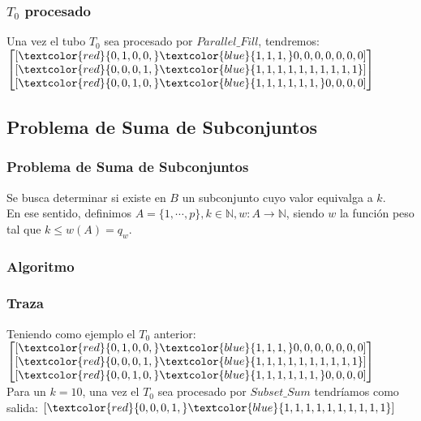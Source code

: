 \documentclass[12pt]{beamer}
\begin{document}
 \begin{frame}
     \frametitle{$T_0$ procesado}
     Una vez el tubo $T_0$ sea procesado por $Parallel\_Fill$, tendremos: \\
    $
        \begin{bmatrix}
            [\textcolor{red}{0, 1, 0, 0,} \textcolor{blue}{1, 1, 1,} 0, 0, 0, 0, 0, 0, 0] \\
            [\textcolor{red}{0, 0, 0, 1,} \textcolor{blue}{1, 1, 1, 1, 1, 1, 1, 1, 1, 1}] \\
            [\textcolor{red}{0, 0, 1, 0,} \textcolor{blue}{1, 1, 1, 1, 1, 1,} 0, 0, 0, 0]
        \end{bmatrix}
    $
 \end{frame}
 \begin{frame}
     \section{Problema de Suma de Subconjuntos}
     \frametitle{Problema de Suma de Subconjuntos}
     Se busca determinar si existe en $B$ un subconjunto cuyo valor equivalga a $k$.\\En ese sentido, definimos $A=\{1,\cdots,p\}, k\in\mathbb{N}, w:A\rightarrow\mathbb{N}$, siendo $w$ la función peso tal que $k\leq w(A)=q_w$.
 \end{frame}
 \begin{frame}
     \frametitle{Algoritmo}
     \begin{algorithmic}[1]
        \EndProcedure
    \end{algorithmic}
 \end{frame}
 \begin{frame}
     \frametitle{Traza}
     Teniendo como ejemplo el $T_0$ anterior:
     $
        \begin{bmatrix}
            [\textcolor{red}{0, 1, 0, 0,} \textcolor{blue}{1, 1, 1,} 0, 0, 0, 0, 0, 0, 0] \\
            [\textcolor{red}{0, 0, 0, 1,} \textcolor{blue}{1, 1, 1, 1, 1, 1, 1, 1, 1, 1}] \\
            [\textcolor{red}{0, 0, 1, 0,} \textcolor{blue}{1, 1, 1, 1, 1, 1,} 0, 0, 0, 0]
        \end{bmatrix}
    $
    \\
    Para un $k=10$, una vez el $T_0$ sea procesado por $Subset\_Sum$ tendríamos como salida: $[\textcolor{red}{0, 0, 0, 1,} \textcolor{blue}{1, 1, 1, 1, 1, 1, 1, 1, 1, 1}]$
 \end{frame}
\end{document}
